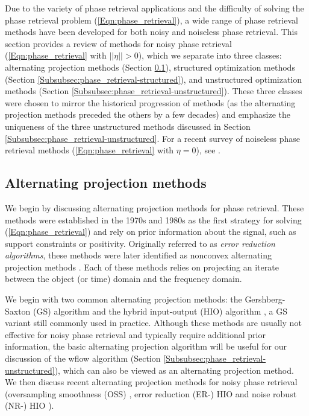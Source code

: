 Due to the variety of phase retrieval applications and the difficulty of solving the phase retrieval problem (\ref{Eqn:phase_retrieval}), a wide range of phase retrieval methods have been developed for both noisy and noiseless phase retrieval.  This section provides a review of methods for noisy phase retrieval (\ref{Eqn:phase_retrieval} with $||\eta|| > 0$), which we separate into three classes: alternating projection methods (Section \ref{Subsubsec:phase_retrieval-alternating_direction_methods}), structured optimization methods (Section \ref{Subsubsec:phase_retrieval-structured}), and unstructured optimization methods (Section \ref{Subsubsec:phase_retrieval-unstructured}).  These three classes were chosen to mirror the historical progression of methods (as the alternating projection methods preceded the others by a few decades) and emphasize the uniqueness of the three unstructured methods discussed in Section \ref{Subsubsec:phase_retrieval-unstructured}.  For a recent survey of noiseless phase retrieval methods (\ref{Eqn:phase_retrieval} with $\eta = 0$), see \cite{DBLP:journals/corr/JaganathanEH15a}.








\subsection{Alternating projection methods}		\label{Subsubsec:phase_retrieval-alternating_direction_methods}



We begin by discussing alternating projection methods for phase retrieval.  These methods were established in the 1970s and 1980s as the first strategy for solving (\ref{Eqn:phase_retrieval}) and rely on prior information about the signal, such as support constraints or positivity.  Originally referred to as \textit{error reduction algorithms}, these methods were later identified as nonconvex alternating projection methods \cite{LeviS84}.  Each of these methods relies on projecting an iterate between the object (or time) domain and the frequency domain.  

We begin with two common alternating projection methods: the Gershberg-Saxton (GS) algorithm \cite{GS72} and the hybrid input-output (HIO) algorithm \cite{Fienup82}, a GS variant still commonly used in practice.  Although these methods are usually not effective for noisy phase retrieval and typically require additional prior information, the basic alternating projection algorithm will be useful for our discussion of the wflow algorithm \cite{DBLP:journals/tit/CandesLS15} (Section \ref{Subsubsec:phase_retrieval-unstructured}), which can also be viewed as an alternating projection method.  We then discuss recent alternating projection methods for noisy phase retrieval (oversampling smoothness (OSS) \cite{rodriguez2013oversampling}, error reduction (ER-) HIO and noise robust (NR-) HIO \cite{martin2012noise}).



